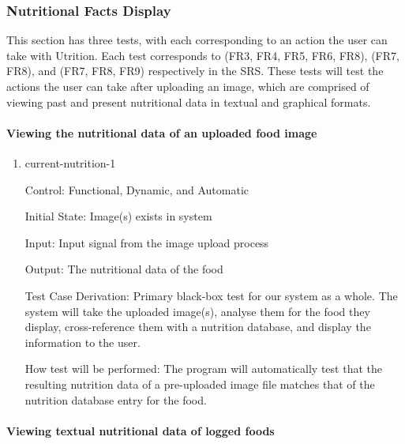 \documentclass[12pt, titlepage]{article}
\begin{document}
	\subsubsection{Nutritional Facts Display}
	This section has three tests, with each corresponding to an action the user can take with Utrition. Each test corresponds to (FR3, FR4, FR5, FR6, FR8), (FR7, FR8), and (FR7, FR8, FR9) respectively in the SRS. These tests will test the actions the user can take after uploading an image, which are comprised of viewing past and present nutritional data in textual and graphical formats.
	
	
	
	\paragraph{Viewing the nutritional data of an uploaded food image}
	
	\begin{enumerate}
		
		\item{current-nutrition-1\\}
		
		Control: Functional, Dynamic, and Automatic
		
		Initial State: Image(s) exists in system
		
		Input: Input signal from the image upload process
		
		Output: The nutritional data of the food
		
		Test Case Derivation: Primary black-box test for our system as a whole. The system will take the uploaded image(s), analyse them for the food they display, cross-reference them with a nutrition database, and display the information to the user.
		
		How test will be performed: The program will automatically test that the resulting nutrition data of a pre-uploaded image file matches that of the nutrition database entry for the food.
		
	\end{enumerate}
	
	\paragraph{Viewing textual nutritional data of logged foods}
	
\end{document}
